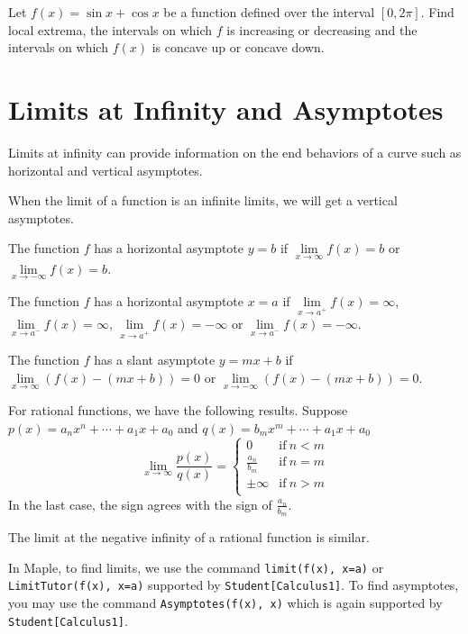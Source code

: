 \documentclass[en,11pt,simple]{elegantbook}
\let\BeginKnitrBlock\begin \let\EndKnitrBlock\end
\begin{document}
\BeginKnitrBlock{exercise}{}{}
\protect\hypertarget{exr:unnamed-chunk-110}{}{\label{exr:unnamed-chunk-110} }
Let \(f(x)=\sin x+\cos x\) be a function defined over the interval \([0, 2\pi]\). Find local extrema, the intervals on which \(f\) is increasing or decreasing and the intervals on which \(f(x)\) is concave up or concave down.
\EndKnitrBlock{exercise}

\hypertarget{limits-at-infinity-and-asymptotes}{%
\section{Limits at Infinity and Asymptotes}\label{limits-at-infinity-and-asymptotes}}

Limits at infinity can provide information on the end behaviors of a curve such as horizontal and vertical asymptotes.

When the limit of a function is an infinite limits, we will get a vertical asymptotes.

The function \(f\) has a horizontal asymptote \(y = b\) if \(\lim\limits_{x\to \infty}f(x)=b\) or \(\lim\limits_{x\to -\infty}f(x)=b\).

The function \(f\) has a horizontal asymptote \(x = a\) if \(\lim\limits_{x\to a^+}f(x)=\infty\), \(\lim\limits_{x\to a^-}f(x)=\infty\), \(\lim\limits_{x\to a^+}f(x)=-\infty\) or \(\lim\limits_{x\to a^-}f(x)=-\infty\).

The function \(f\) has a slant asymptote \(y = mx + b\) if \(\lim\limits_{x\to \infty}(f(x)-(mx+b))=0\) or \(\lim\limits_{x\to -\infty}(f(x)-(mx+b))=0\).

For rational functions, we have the following results.
Suppose \(p(x)=a_nx^n+\cdots +a_1x+ a_0\) and \(q(x)=b_mx^m+\cdots +a_1x+ a_0\)
\[
\lim\limits_{x\to \infty}\frac{p(x)}{q(x)}=
\begin{cases}
    0 & \text{if}~ n<m\\
    \frac{a_n}{b_m} & \text{if}~ n=m\\
    \pm\infty & \text{if}~ n>m\\
\end{cases}
\]
In the last case, the sign agrees with the sign of \(\frac{a_n}{b_m}\).

The limit at the negative infinity of a rational function is similar.

In Maple, to find limits, we use the command \texttt{limit(f(x),\ x=a)} or \texttt{LimitTutor(f(x),\ x=a)} supported by \texttt{Student{[}Calculus1{]}}. To find asymptotes, you may use the command \texttt{Asymptotes(f(x),\ x)} which is again supported by \texttt{Student{[}Calculus1{]}}.
\end{document}
